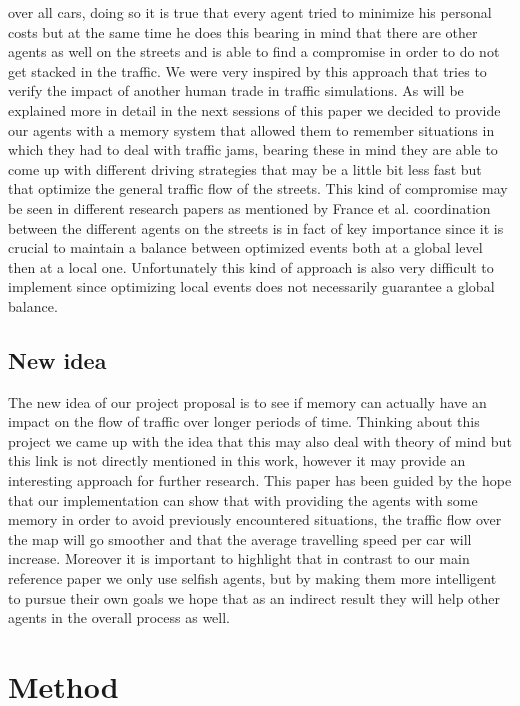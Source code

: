 \documentclass[a4paper,hidelinks]{article}
\begin{document}
over all cars, doing so it is true that every agent tried to minimize his personal costs but at the same time he does this bearing in mind that there are other agents as well on the streets and is able to find a compromise in order to do not get stacked in the traffic. We were very inspired by this approach that tries to verify the impact of another human trade in traffic simulations. As will be explained more in detail in the next sessions of this paper we decided to provide our agents with a memory system that allowed them to remember situations in which they had to deal with traffic jams, bearing these in mind they are able to come up with different driving strategies that may be a little bit less fast but that optimize the general traffic flow of the streets.
This kind of compromise may be seen in different research papers as mentioned by France et al. \cite{france2003multiagent} coordination between the different agents on the streets is in fact of key importance since it is crucial to maintain a balance between optimized events both at a global level then at a local one. Unfortunately this kind of approach is also very difficult to implement since optimizing local events does not necessarily guarantee a global balance.         

\subsection{New idea}
The new idea of our project proposal is to see if memory can actually have an impact on the flow of traffic over longer periods of time. Thinking about this project we came up with the idea that this may also deal with theory of mind but this link is not directly mentioned in this work, however it may provide an interesting approach for further research. This paper has been guided by the hope that our implementation can show that with providing the agents with some memory in order to avoid previously encountered situations, the traffic flow over the map will go smoother and that the average travelling speed per car will increase. Moreover it is important to highlight that in contrast to our main reference paper \cite{gabel2012cooperative} we only use selfish agents, but by making them more intelligent to pursue their own goals we hope that as an indirect result they will help other agents in the overall process as well.

\section{Method}
\end{document}
